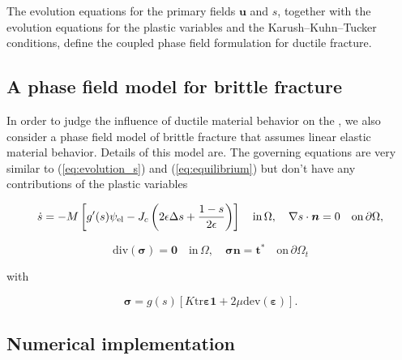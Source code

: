 \documentclass[pdflatex,sn-mathphys-num]{sn-jnl}%
\theoremstyle{thmstyleone}%
\theoremstyle{thmstyletwo}%
\theoremstyle{thmstylethree}%
\begin{document}
The evolution equations for the primary fields $\boldsymbol{u}$ and $s$, together with the evolution equations for the plastic variables and the Karush--Kuhn--Tucker conditions, define the coupled phase field formulation for ductile fracture.


\subsection{A phase field model for brittle fracture}
\label{sec:phasefield_elastic}

In order to judge the influence of ductile material behavior on the , 
we also consider a phase field model of brittle fracture that assumes linear elastic material behavior. 
Details of this model are. The governing equations 
are very similar to (\ref{eq:evolution_s}) and (\ref{eq:equilibrium}) but don't have
any contributions of the plastic variables  

\begin{equation}
    \dot{s} = -M \left[g'(s)\psi_{\rm{el}}  - J_c\left(2\epsilon\Delta{s} + \dfrac{1-s}{2\epsilon}\right)\right] \quad \text{in} \, \Omega, \quad \nabla{s}\cdot{\boldsymbol{n}} = 0\quad\text{on}\,\partial\Omega,
    \label{eq:evolution_s_elastic}
\end{equation}

\begin{equation}
    \text{div}(\boldsymbol{\sigma}) = \boldsymbol{0} \quad \text{in} \, \Omega, \quad{\boldsymbol{\sigma} \boldsymbol{n} =\boldsymbol{t}^*} \quad\text{on}\,\partial\Omega_t
    \label{eq:equilibrium_elastic}
\end{equation}

with 

\begin{equation}
    \boldsymbol{\sigma} = g(s)\left[K \text{tr}\boldsymbol{\varepsilon}\boldsymbol{1} + 2\mu\text{dev}(\boldsymbol{\varepsilon})\right].
\end{equation}



\subsection{Numerical implementation}
\label{sec:numerical_implementation}
\end{document}
